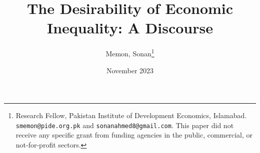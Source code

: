 \documentclass[12pt]{article}
\newcommand{\1}{\mathbbm 1}
\begin{document}
	
	
	
	
	
	
	\title{{The Desirability of Economic Inequality: A Discourse %
			}}
			
			\date{November 2023%
		}
		
		
		\author{Memon, Sonan\footnote{Research Fellow, Pakistan Institute of Development Economics, Islamabad. \texttt{smemon@pide.org.pk} and \texttt{sonanahmed8@gmail.com}. This paper did not receive any specific grant from funding agencies in the public, commercial, or not-for-profit sectors.}} 
		
		\maketitle
		
		\vspace{-2ex}
		
\end{document}
